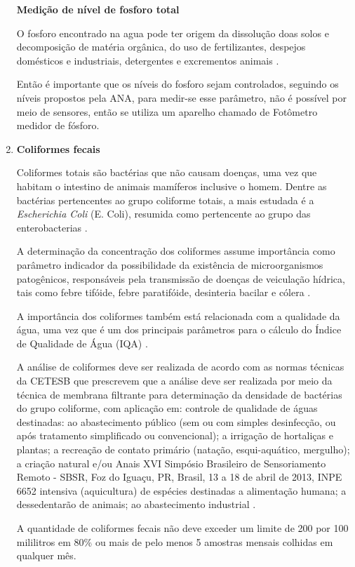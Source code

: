 \begin{enumerate}
	\begin{center}
	 \textbf{Medição de nível de fosforo total}
	\end{center}
	
	O fosforo encontrado na agua pode ter origem da dissolução doas solos e decomposição de matéria orgânica,
	do uso de fertilizantes, despejos domésticos e industriais, detergentes e excrementos animais \cite{danelon12}.
	
	Então é importante que os níveis do fosforo sejam controlados, seguindo os níveis propostos pela ANA,
	para medir-se esse parâmetro, não é possível por meio de sensores, então
	se utiliza um aparelho chamado de Fotômetro medidor de fósforo.
	
    \item \textbf{Coliformes fecais}
    
	Coliformes totais são bactérias que não causam doenças, uma vez que habitam o intestino de animais mamíferos inclusive
	o homem. Dentre as bactérias pertencentes ao grupo coliforme totais, a mais estudada é a \textit{Escherichia Coli} (E. Coli),
	resumida como pertencente ao grupo das enterobacterias \cite{neidhardt96}.
	
	A determinação da concentração dos coliformes assume importância como parâmetro indicador da possibilidade da 
	existência de microorganismos patogênicos, responsáveis pela transmissão de doenças de veiculação hídrica, tais como
	febre tifóide, febre paratifóide, desinteria bacilar e cólera \cite{anaGovIndicadores}.
	
	A importância dos coliformes também está relacionada com a qualidade da água, uma vez que é um dos principais
	parâmetros para o cálculo do Índice de Qualidade de Água (IQA) \cite{cetesbIndiceQualidadeH2O}.
	
	A análise de coliformes deve ser realizada de acordo com as normas técnicas da CETESB que prescrevem que a análise
	deve ser realizada por meio da técnica de membrana filtrante para determinação da densidade de bactérias do grupo
	coliforme, com aplicação em: controle de qualidade de águas destinadas: ao abastecimento público (sem ou com simples
	desinfecção, ou após tratamento simplificado ou convencional); a irrigação de hortaliças e plantas; a recreação de
	contato primário (natação, esqui-aquático, mergulho); a criação natural e/ou Anais XVI Simpósio Brasileiro de
	Sensoriamento Remoto - SBSR, Foz do Iguaçu, PR, Brasil, 13 a 18 de abril de 2013, INPE 6652 intensiva (aquicultura)
	de espécies destinadas a alimentação humana; a dessedentarão de animais; ao abastecimento industrial \cite{cetesb84}.
	
	A quantidade de coliformes fecais não deve exceder um limite de 200 por 100 mililitros em 80\% ou mais de pelo menos
	5 amostras mensais colhidas em qualquer mês.
	
  \end{enumerate}
